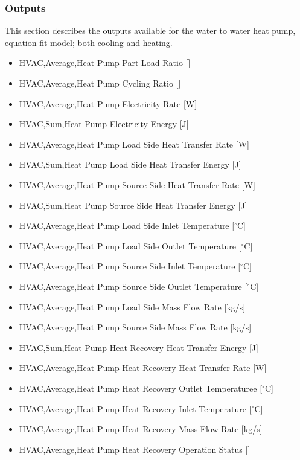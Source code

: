 \subsubsection{Outputs}\label{plhp_eir_outputs}

This section describes the outputs available for the water to water heat pump, equation fit model; both cooling and heating.

\begin{itemize}
    \item
    HVAC,Average,Heat Pump Part Load Ratio  {[}{]}
    \item
    HVAC,Average,Heat Pump Cycling Ratio  {[}{]}
    \item
    HVAC,Average,Heat Pump Electricity Rate {[}W{]}
    \item
    HVAC,Sum,Heat Pump Electricity Energy {[}J{]}
    \item
    HVAC,Average,Heat Pump Load Side Heat Transfer Rate {[}W{]}
    \item
    HVAC,Sum,Heat Pump Load Side Heat Transfer Energy {[}J{]}
    \item
    HVAC,Average,Heat Pump Source Side Heat Transfer Rate {[}W{]}
    \item
    HVAC,Sum,Heat Pump Source Side Heat Transfer Energy {[}J{]}
    \item
    HVAC,Average,Heat Pump Load Side Inlet Temperature {[}$^\circ$C{]}
    \item
    HVAC,Average,Heat Pump Load Side Outlet Temperature {[}$^\circ$C{]}
    \item
    HVAC,Average,Heat Pump Source Side Inlet Temperature {[}$^\circ$C{]}
    \item
    HVAC,Average,Heat Pump Source Side Outlet Temperature {[}$^\circ$C{]}
    \item
    HVAC,Average,Heat Pump Load Side Mass Flow Rate {[}kg/s{]}
    \item
    HVAC,Average,Heat Pump Source Side Mass Flow Rate {[}kg/s{]}
    \item
    HVAC,Sum,Heat Pump Heat Recovery Heat Transfer Energy {[}J{]}
    \item
    HVAC,Average,Heat Pump Heat Recovery Heat Transfer Rate {[}W{]}
    \item
    HVAC,Average,Heat Pump Heat Recovery Outlet Temperaturee {[}$^\circ$C{]}
    \item
    HVAC,Average,Heat Pump Heat Recovery Inlet Temperature {[}$^\circ$C{]}
    \item
    HVAC,Average,Heat Pump Heat Recovery Mass Flow Rate {[}kg/s{]}
    \item
    HVAC,Average,Heat Pump Heat Recovery Operation Status {[}{]}
\end{itemize}

